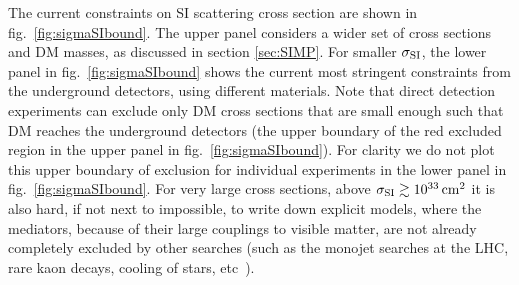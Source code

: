 \bigskip

The current constraints on SI scattering cross section are shown in fig.~\ref{fig:sigmaSIbound}. The upper panel considers a wider set of cross sections and DM masses, as discussed in section \ref{sec:SIMP}. 
For smaller $\sigma_{\rm SI}$, the lower panel in  fig.~\ref{fig:sigmaSIbound} shows the current most stringent constraints from the underground detectors, using different materials. Note that direct detection experiments can exclude only DM cross sections that are small enough such that DM reaches the underground detectors (the upper boundary of the red excluded region in the upper panel in fig.~\ref{fig:sigmaSIbound}). For clarity we do not plot this upper boundary of exclusion for individual experiments in the lower panel in fig.~\ref{fig:sigmaSIbound}. For very large cross sections, above $\sigma_{\rm SI}\gtrsim 10^{33}\,\text{cm}^2$ it is also hard, if not next to impossible, to write down explicit models, where the mediators, because of their large couplings to visible matter, are not already completely excluded by other searches (such as the monojet searches at the LHC, rare kaon decays, cooling of stars, etc~\cite{2011.01939}). 


